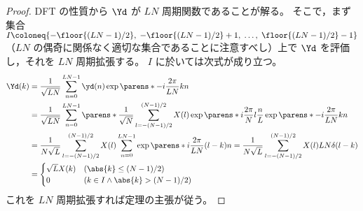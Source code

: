             \begin{proof}
                \quad\par
                DFT の性質から $\Yd$ が $LN$ 周期関数であることが解る。
                そこで，まず集合 $I\coloneq\{-\floor{(LN-1)/2},\;-\floor{(LN-1)/2}+1,\;\dots,\;\floor{(LN-1)/2}-1\}$ （$LN$ の偶奇に関係なく適切な集合であることに注意すべし）上で $\Yd$ を評価し，それを $LN$ 周期拡張する。
                $I$ に於いては次式が成り立つ。
                \begin{align*}
                    \Yd(k) &= \frac{1}{\sqrt{LN}}\sum_{n=0}^{LN-1}\yd(n)\exp\parens*{-i\frac{2\pi}{LN}kn} \\
                    &= \frac{1}{\sqrt{LN}}\sum_{n=0}^{LN-1}\parens*{\frac{1}{\sqrt{N}}\sum_{l=-(N-1)/2}^{(N-1)/2}X(l)\exp\parens*{i\frac{2\pi}{N}l\frac{n}{L}}}\exp\parens*{-i\frac{2\pi}{LN}kn} \\
                    &= \frac{1}{N\sqrt{L}}\sum_{l=-(N-1)/2}^{(N-1)/2}X(l)\sum_{n=0}^{LN-1}\exp\parens*{i\frac{2\pi}{LN}(l-k)n} = \frac{1}{N\sqrt{L}}\sum_{l=-(N-1)/2}^{(N-1)/2}X(l)LN\delta(l-k) \\
                    &= \begin{cases}
                        \sqrt{L}X(k) & (\abs{k}\leq (N-1)/2) \\
                        0 & (k\in I\land\abs{k}>(N-1)/2)
                    \end{cases}
                \end{align*}
                これを $LN$ 周期拡張すれば定理の主張が従う。
            \end{proof}
